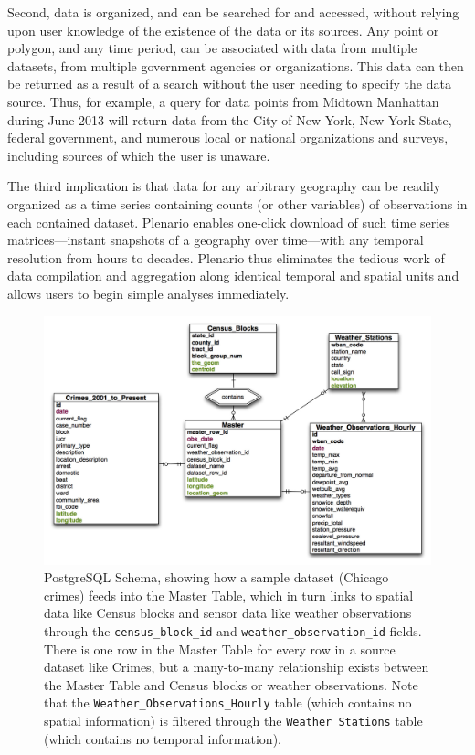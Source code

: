 \documentclass[11pt]{article}
\begin{document}
Second, data is organized, and can be searched for and accessed, without relying upon user knowledge of the existence of the data or its sources. Any point or polygon, and any time period, can be associated with data from multiple datasets, from multiple government agencies or organizations. This data can then be returned as a result of a search without the user needing to specify the data source. Thus, for example, a query for data points from Midtown Manhattan during June 2013 will return data from the City of New York, New York State, federal government, and numerous local or national organizations and surveys, including sources of which the user is unaware. 

The third implication is that data for any arbitrary geography can be readily organized as a time series containing counts (or other variables) of observations in each contained dataset. Plenario enables one-click download of such time series matrices---instant snapshots of a geography over time---with any temporal resolution from hours to decades. Plenario thus eliminates the tedious work of data compilation and aggregation along identical temporal and spatial units and allows users to begin simple analyses immediately.

\begin{figure}
	\centering
	\label{fig:db-schema}
	\caption{PostgreSQL Schema, showing how a sample dataset (Chicago crimes) feeds into the Master Table, which in turn links to spatial data like Census blocks and sensor data like weather observations through the \texttt{census\_block\_id} and \texttt{weather\_observation\_id} fields. There is one row in the Master Table for every row in a source dataset like Crimes, but a many-to-many relationship exists between the Master Table and Census blocks or weather observations. Note that the \texttt{Weather\_Observations\_Hourly} table (which contains no spatial information) is filtered through the \texttt{Weather\_Stations} table (which contains no temporal information). \vspace{.4cm}}
	\includegraphics[scale=.45]{db_schema.pdf}
\end{figure}
\end{document}
